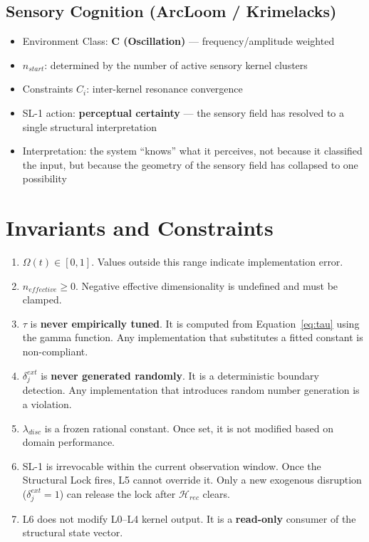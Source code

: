 \documentclass[11pt, a4paper]{article}
\begin{document}
\subsection{Sensory Cognition (ArcLoom / Krimelacks)}

\begin{itemize}[nosep]
  \item Environment Class: \textbf{C (Oscillation)} --- frequency/amplitude weighted
  \item $n_{start}$: determined by the number of active sensory kernel clusters
  \item Constraints $C_i$: inter-kernel resonance convergence
  \item SL-1 action: \textbf{perceptual certainty} --- the sensory field has
        resolved to a single structural interpretation
  \item Interpretation: the system ``knows'' what it perceives, not because
        it classified the input, but because the geometry of the sensory
        field has collapsed to one possibility
\end{itemize}

\section{Invariants and Constraints}

\begin{enumerate}
  \item $\Omega(t) \in [0, 1]$. Values outside this range indicate
        implementation error.
  \item $n_{effective} \geq 0$. Negative effective dimensionality is
        undefined and must be clamped.
  \item $\tau$ is \textbf{never empirically tuned}. It is computed from
        Equation~\ref{eq:tau} using the gamma function. Any implementation
        that substitutes a fitted constant is non-compliant.
  \item $\delta_j^{ext}$ is \textbf{never generated randomly}. It is a
        deterministic boundary detection. Any implementation that introduces
        random number generation is a violation.
  \item $\lambda_{disc}$ is a frozen rational constant. Once set, it is
        not modified based on domain performance.
  \item SL-1 is irrevocable within the current observation window. Once
        the Structural Lock fires, L5 cannot override it. Only a new
        exogenous disruption ($\delta_j^{ext} = 1$) can release the lock
        after $\mathcal{H}_{rec}$ clears.
  \item L6 does not modify L0--L4 kernel output. It is a \textbf{read-only}
        consumer of the structural state vector.
\end{enumerate}
\end{document}
